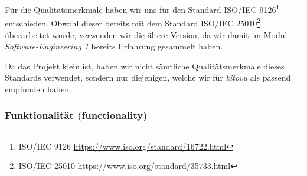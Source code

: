 \documentclass[a4paper]{article}
\begin{document}
\newcommand{\isourl}[2]{ISO/IEC #1\footnote{ISO/IEC #1 \url{https://www.iso.org/standard/#2.html}}}

Für die Qualitätsmerkmale haben wir uns für den Standard \isourl{9126}{16722} entschieden. Obwohl dieser bereits mit dem Standard \isourl{25010}{35733} überarbeitet wurde, verwenden wir die ältere Version, da wir damit im Modul \emph{Software-Engineering 1} bereits Erfahrung gesammelt haben.

Da das Projekt klein ist, haben wir nicht sämtliche Qualitätsmerkmale dieses Standards verwendet, sondern nur diejenigen, welche wir für \emph{kitovu} als passend empfunden haben.

\newcommand{\metricheader}[2]{\textbf{#1} & \textbf{#2}}

\subsubsection{Funktionalität (functionality)}
\end{document}
